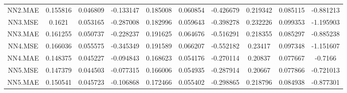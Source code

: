 \begin{longtable}[t]{cccccccccc}
NN2.MAE & 0.155816 & 0.046809 & -0.133147 & 0.185008 & 0.060854 & -0.426679 & 0.219342 & 0.085115 & -0.881213\\
NN3.MSE & 0.1621 & 0.053165 & -0.287008 & 0.182996 & 0.059643 & -0.398278 & 0.232226 & 0.099353 & -1.195903\\
NN3.MAE & 0.161255 & 0.050737 & -0.228237 & 0.191625 & 0.064676 & -0.516291 & 0.218355 & 0.085297 & -0.885238\\
NN4.MSE & 0.166036 & 0.055575 & -0.345349 & 0.191589 & 0.066207 & -0.552182 & 0.23417 & 0.097348 & -1.151607\\
NN4.MAE & 0.148375 & 0.045227 & -0.094843 & 0.168623 & 0.054176 & -0.270114 & 0.20837 & 0.077667 & -0.7166\\
NN5.MSE & 0.147379 & 0.044503 & -0.077315 & 0.166006 & 0.054935 & -0.287914 & 0.20667 & 0.077866 & -0.721013\\
NN5.MAE & 0.150541 & 0.045723 & -0.106868 & 0.172466 & 0.055402 & -0.298865 & 0.218796 & 0.084938 & -0.877301\\*
\end{longtable}
\endgroup{}